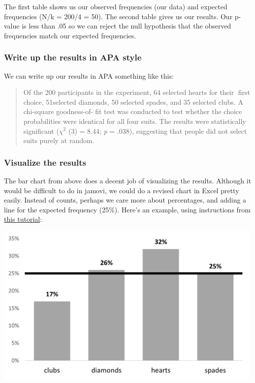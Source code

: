 \documentclass[
]{book}
\begin{document}
The first table shows us our observed frequencies (our data) and expected frequencies (N/k = 200/4 = 50). The second table gives us our results. Our p-value is less than .05 so we can reject the null hypothesis that the observed frequencies match our expected frequencies.

\hypertarget{write-up-the-results-in-apa-style-3}{%
\subsubsection{Write up the results in APA style}\label{write-up-the-results-in-apa-style-3}}

We can write up our results in APA something like this:

\begin{quote}
Of the 200 participants in the experiment, 64 selected hearts for their first choice, 51selected diamonds, 50 selected spades, and 35 selected clubs. A chi-square goodness-of-fit test was conducted to test whether the choice probabilities were identical for all four suits. The results were statistically significant (\(\chi^2\) (3) = 8.44; \emph{p} = .038), suggesting that people did not select suits purely at random.
\end{quote}

\hypertarget{visualize-the-results-3}{%
\subsubsection{Visualize the results}\label{visualize-the-results-3}}

The bar chart from above does a decent job of visualizing the results. Although it would be difficult to do in jamovi, we could do a revised chart in Excel pretty easily. Instead of counts, perhaps we care more about percentages, and adding a line for the expected frequency (25\%). Here's an example, using instructions from \href{https://exceljet.net/chart/column-chart-with-target-line}{this tutorial}:

\includegraphics[width=5.20833in,height=\textheight]{images/09-chi-square/chi-square_excel.png}
\end{document}
